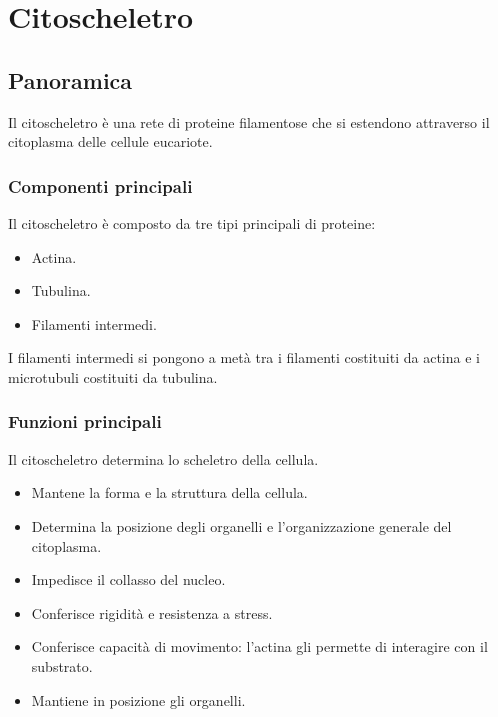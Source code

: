\chapter{Citoscheletro}

\section{Panoramica}
Il citoscheletro \`e una rete di proteine filamentose che si estendono attraverso il citoplasma delle cellule eucariote.

	\subsection{Componenti principali}
	Il citoscheletro \`e composto da tre tipi principali di proteine:
	\begin{multicols}{3}
		\begin{itemize}
			\item Actina.
			\item Tubulina.
			\item Filamenti intermedi.
		\end{itemize}
	\end{multicols}
	I filamenti intermedi si pongono a met\`a tra i filamenti costituiti da actina e i microtubuli costituiti da tubulina.

	\subsection{Funzioni principali}
	Il citoscheletro determina lo scheletro della cellula.
	\begin{multicols}{2}
		\begin{itemize}
			\item Mantene la forma e la struttura della cellula.
			\item Determina la posizione degli organelli e l'organizzazione generale del citoplasma.
			\item Impedisce il collasso del nucleo.
			\item Conferisce rigidit\`a e resistenza a stress.
			\item Conferisce capacit\`a di movimento: l'actina gli permette di interagire con il substrato.
			\item Mantiene in posizione gli organelli.
		\end{itemize}
	\end{multicols}

